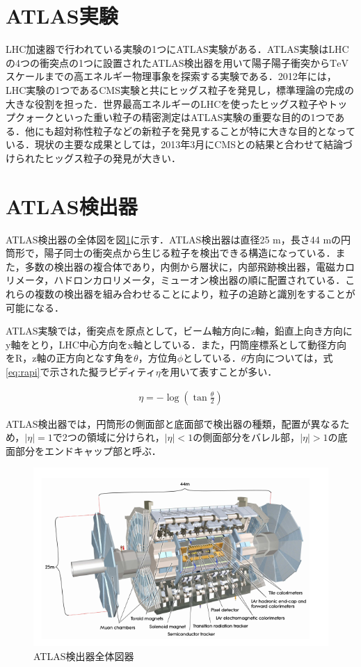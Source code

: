 \section{ATLAS実験}
\label{sec:ATLAS-ex}
LHC加速器で行われている実験の1つにATLAS実験がある．ATLAS実験はLHCの4つの衝突点の1つに設置されたATLAS検出器を用いて陽子陽子衝突から$\mathrm{TeV}$スケールまでの高エネルギー物理事象を探索する実験である．2012年には，LHC実験の1つであるCMS実験と共にヒッグス粒子を発見し，標準理論の完成の大きな役割を担った．世界最高エネルギーのLHCを使ったヒッグス粒子やトップクォークといった重い粒子の精密測定はATLAS実験の重要な目的の1つである．他にも超対称性粒子などの新粒子を発見することが特に大きな目的となっている．現状の主要な成果としては，2013年3月にCMSとの結果と合わせて結論づけられたヒッグス粒子の発見が大きい．\par

\section{ATLAS検出器}
\label{sec:ATLAS}
ATLAS検出器の全体図を図\ref{fig:ATLAS}に示す．ATLAS検出器は直径25 $\mathrm{m}$，長さ44 $\mathrm{m}$の円筒形で，陽子同士の衝突点から生じる粒子を検出できる構造になっている．また，多数の検出器の複合体であり，内側から層状に，内部飛跡検出器，電磁カロリメータ，ハドロンカロリメータ，ミューオン検出器の順に配置されている．これらの複数の検出器を組み合わせることにより，粒子の追跡と識別をすることが可能になる．\par
ATLAS実験では，衝突点を原点として，ビーム軸方向にz軸，鉛直上向き方向にy軸をとり，LHC中心方向をx軸としている．また，円筒座標系として動径方向をR，z軸の正方向となす角を$\theta$，方位角$\phi$としている．$\theta$方向については，式\ref{eq:rapi}で示された擬ラピディティ$\eta$を用いて表すことが多い．

\begin{eqnarray}
  \eta = -\log \left(\tan \frac{\theta}{2} \right)
  \label{eq:rapi}
\end{eqnarray}

ATLAS検出器では，円筒形の側面部と底面部で検出器の種類，配置が異なるため，$|\eta| = 1$で2つの領域に分けられ，$|\eta| < 1$の側面部分をバレル部，$|\eta| > 1$の底面部分をエンドキャップ部と呼ぶ．

\begin{figure}[h]
\centering
\includegraphics[width=12cm]{./figure/ATLAS.png}
\caption{ATLAS検出器全体図器\cite{Collaboration_2008}}
\label{fig:ATLAS}
\end{figure}

